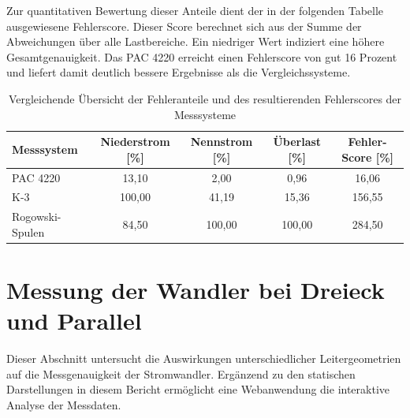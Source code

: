 \documentclass[a4paper,12pt]{scrartcl}
\begin{document}
Zur quantitativen Bewertung dieser Anteile dient der in der folgenden Tabelle ausgewiesene Fehlerscore. Dieser Score berechnet sich aus der Summe der Abweichungen über alle Lastbereiche. Ein niedriger Wert indiziert eine höhere Gesamtgenauigkeit. Das PAC 4220 erreicht einen Fehlerscore von gut 16 Prozent und liefert damit deutlich bessere Ergebnisse als die Vergleichssysteme.

\begin{table}[H]
    \centering
    \caption{Vergleichende Übersicht der Fehleranteile und des resultierenden Fehlerscores der Messsysteme}
    \label{tab:fehler_score_vergleich}
    \begin{tabular}{lcccc}
        \hline
        \textbf{Messsystem} & \textbf{Niederstrom [\%]} & \textbf{Nennstrom [\%]} & \textbf{Überlast [\%]} & \textbf{Fehler-Score [\%]} \\ \hline
        PAC 4220            & 13,10                     & 2,00                    & 0,96                   & 16,06                      \\
        K-3                 & 100,00                    & 41,19                   & 15,36                  & 156,55                     \\
        Rogowski-Spulen     & 84,50                     & 100,00                  & 100,00                 & 284,50                     \\ \hline
    \end{tabular}
\end{table}

\section{Messung der Wandler bei Dreieck und Parallel}
\label{sec:messung_wandler}

Dieser Abschnitt untersucht die Auswirkungen unterschiedlicher Leitergeometrien auf die Messgenauigkeit der Stromwandler. Ergänzend zu den statischen Darstellungen in diesem Bericht ermöglicht eine Webanwendung die interaktive Analyse der Messdaten.
\end{document}
